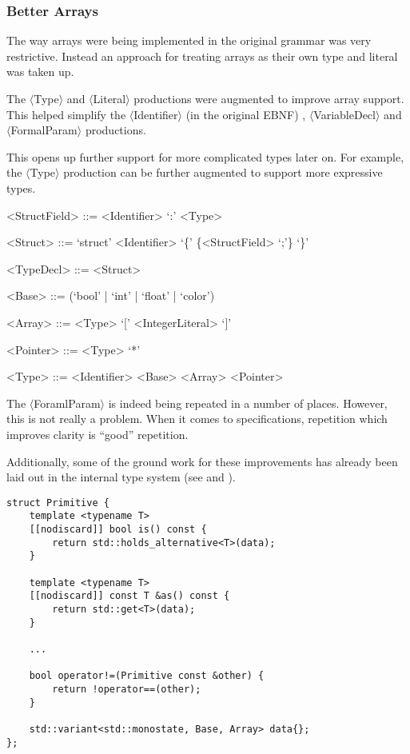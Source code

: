 \subsubsection{Better Arrays}\label{sss:secarrays}

The way arrays were being implemented in the original grammar
was very restrictive. Instead an approach for treating arrays as
their own type and literal was taken up.

The $\langle$Type$\rangle$ and $\langle$Literal$\rangle$
productions were augmented to improve array support. This helped
simplify the $\langle$Identifier$\rangle$ (in the original EBNF)
, $\langle$VariableDecl$\rangle$ and
$\langle$FormalParam$\rangle$ productions.

This opens up further support for more complicated types later
on. For example, the $\langle$Type$\rangle$ production can be
further augmented to support more expressive types.

\begin{grammar}

<StructField> ::= <Identifier> `:' <Type>

<Struct> ::= `struct' <Identifier> `\{' \{<StructField> `;'\} `\}'

<TypeDecl> ::= <Struct>

<Base> ::= (`bool' | `int' | `float' | `color')

<Array> ::= <Type> `[' <IntegerLiteral> `]'

<Pointer> ::= <Type> `*'

<Type> ::= <Identifier>
\alt <Base>
\alt <Array>
\alt <Pointer>
\end{grammar}

\begin{note}
The $\langle$ForamlParam$\rangle$ is indeed being repeated in a
number of places. However, this is not really a problem. When it
comes to specifications, repetition which improves clarity is
``good'' repetition.
\end{note}

\label{sss:primitive}Additionally, some of the ground work for
these improvements has already been laid out in the internal
type system (see  and
).



\begin{lstlisting}[caption={The \texttt{Primitive} class
declaration (parl/Core.hpp).}, label=lst:primitive]
struct Primitive {
    template <typename T>
    [[nodiscard]] bool is() const {
        return std::holds_alternative<T>(data);
    }

    template <typename T>
    [[nodiscard]] const T &as() const {
        return std::get<T>(data);
    }

    ...

    bool operator!=(Primitive const &other) {
        return !operator==(other);
    }

    std::variant<std::monostate, Base, Array> data{};
};
\end{lstlisting}

